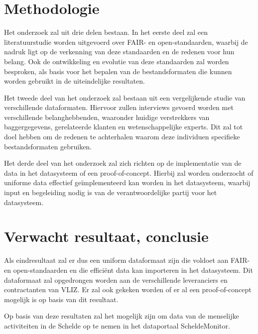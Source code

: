 
\section{Methodologie}%
\label{sec:methodologie}

Het onderzoek zal uit drie delen bestaan. In het eerste deel zal een literatuurstudie worden uitgevoerd over FAIR- en open-standaarden, waarbij de nadruk ligt op de verkenning van deze standaarden en de redenen voor hun belang. Ook de ontwikkeling en evolutie van deze standaarden zal worden besproken, als basis voor het bepalen van de bestandsformaten die kunnen worden gebruikt in de uiteindelijke resultaten.

Het tweede deel van het onderzoek zal bestaan uit een vergelijkende studie van verschillende dataformaten. Hiervoor zullen interviews gevoerd worden met verschillende belanghebbenden, waaronder huidige verstrekkers van baggergegevens, gerelateerde klanten en wetenschappelijke experts. Dit zal tot doel hebben om de redenen te achterhalen waarom deze individuen specifieke bestandsformaten gebruiken.

Het derde deel van het onderzoek zal zich richten op de implementatie van de data in het datasysteem of een proof-of-concept. Hierbij zal worden onderzocht of uniforme data effectief geïmplementeerd kan worden in het datasysteem, waarbij input en begeleiding nodig is van de verantwoordelijke partij voor het datasysteem.

\section{Verwacht resultaat, conclusie}%
\label{sec:verwachte_resultaten}

Als eindresultaat zal er dus een uniform dataformaat zijn die voldoet aan FAIR- en open-standaarden en die efficiënt data kan importeren in het datasysteem. Dit dataformaat zal opgedrongen worden aan de verschillende leveranciers en contractanten van VLIZ. Er zal ook gekeken worden of er al een proof-of-concept mogelijk is op basis van dit resultaat.

Op basis van deze resultaten zal het mogelijk zijn om data van de menselijke activiteiten in de Schelde op te nemen in het dataportaal ScheldeMonitor.

